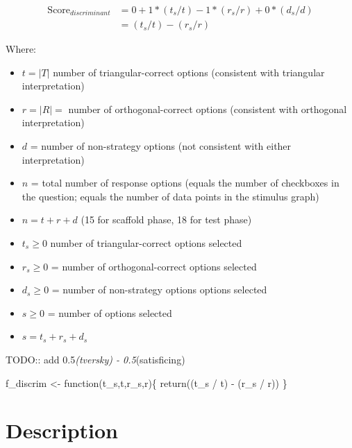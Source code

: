 \documentclass[
  letterpaper,
  DIV=11,
  numbers=noendperiod]{scrreprt}
\newenvironment{Shaded}{\begin{snugshade}}{\end{snugshade}}
\newcommand{\ControlFlowTok}[1]{\textcolor[rgb]{0.00,0.23,0.31}{#1}}
\newcommand{\FunctionTok}[1]{\textcolor[rgb]{0.28,0.35,0.67}{#1}}
\newcommand{\NormalTok}[1]{\textcolor[rgb]{0.00,0.23,0.31}{#1}}
\newcommand{\OtherTok}[1]{\textcolor[rgb]{0.00,0.23,0.31}{#1}}
\newcommand{\SpecialCharTok}[1]{\textcolor[rgb]{0.37,0.37,0.37}{#1}}
\providecommand{\tightlist}{%
  \setlength{\itemsep}{0pt}\setlength{\parskip}{0pt}}\usepackage{longtable,booktabs,array}
\begin{document}
\begin{align}
\text{Score}_{discriminant} &= 0 + 1*(t_s / t) - 1 * (r_s / r) + 0*(d_s / d) \\
&= (t_s / t) - (r_s / r) 
\end{align}

Where:

\begin{itemize}
\tightlist
\item
  \(t = |T|\) number of triangular-correct options (consistent with
  triangular interpretation)
\item
  \(r = |R| =\) number of orthogonal-correct options (consistent with
  orthogonal interpretation)
\item
  \(d\) = number of non-strategy options (not consistent with either
  interpretation)
\item
  \(n\) = total number of response options (equals the number of
  checkboxes in the question; equals the number of data points in the
  stimulus graph)
\item
  \(n = t + r + d\) (15 for scaffold phase, 18 for test phase)
\item
  \(t_s \ge 0\) number of triangular-correct options selected
\item
  \(r_s \ge 0\) = number of orthogonal-correct options selected
\item
  \(d_s \ge 0\) = number of non-strategy options options selected
\item
  \(s \ge 0\) = number of options selected
\item
  \(s = t_s + r_s + d_s\)
\end{itemize}

TODO:: add 0.5\emph{(tversky) - 0.5}(satisficing)

\begin{Shaded}
\begin{Highlighting}[]
\NormalTok{f\_discrim }\OtherTok{\textless{}{-}} \ControlFlowTok{function}\NormalTok{(t\_s,t,r\_s,r)\{}
  \FunctionTok{return}\NormalTok{((t\_s }\SpecialCharTok{/}\NormalTok{ t) }\SpecialCharTok{{-}}\NormalTok{ (r\_s }\SpecialCharTok{/}\NormalTok{ r))}
\NormalTok{\}}
\end{Highlighting}
\end{Shaded}

\newpage

\hypertarget{sec-SGC3A-description}{%
\chapter{Description}\label{sec-SGC3A-description}}
\end{document}
